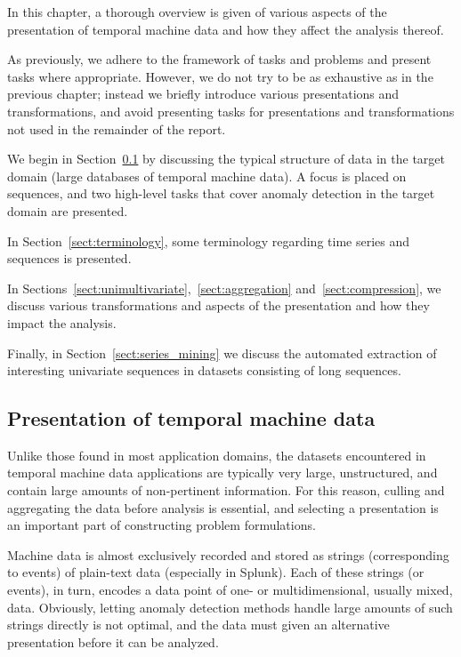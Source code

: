 In this chapter, a thorough overview is given of various aspects of the presentation of temporal machine data and how they affect the analysis thereof.

As previously, we adhere to the framework of tasks and problems and present tasks where appropriate. However, we do not try to be as exhaustive as in the previous chapter; instead we briefly introduce various presentations and transformations, and avoid presenting tasks for presentations and transformations not used in the remainder of the report.

We begin in Section~\ref{sect:splunk_techniques} by discussing the typical structure of data in the target domain (large databases of temporal machine data). A focus is placed on sequences, and two high-level tasks that cover anomaly detection in the target domain are presented.

In Section~\ref{sect:terminology}, some terminology regarding time series and sequences is presented.

In Sections~\ref{sect:unimultivariate},~\ref{sect:aggregation} and~\ref{sect:compression}, we discuss various transformations and aspects of the presentation and how they impact the analysis.

Finally, in Section~\ref{sect:series_mining} we discuss the automated extraction of interesting univariate sequences in datasets consisting of long sequences.

\subsection{Presentation of temporal machine data}
\label{sect:splunk_techniques}

Unlike those found in most application domains, the datasets encountered in temporal machine data applications are typically very large, unstructured, and contain large amounts of non-pertinent information. For this reason, culling and aggregating the data before analysis is essential, and selecting a presentation is an important part of constructing problem formulations.

Machine data is almost exclusively recorded and stored as strings (corresponding to events) of plain-text data (especially in Splunk). Each of these strings (or events), in turn, encodes a data point of one- or multidimensional, usually mixed, data. Obviously, letting anomaly detection methods handle large amounts of such strings directly is not optimal, and the data must given an alternative presentation before it can be analyzed.


